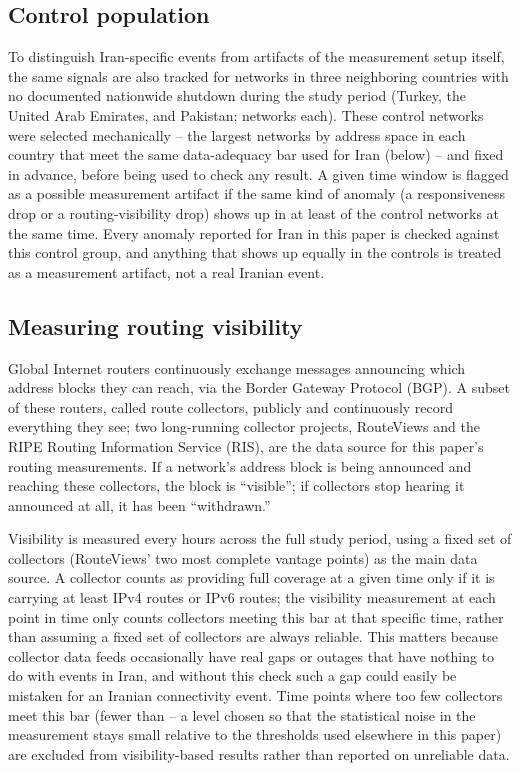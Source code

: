 \subsection{Control population}

To distinguish Iran-specific events from artifacts of the measurement
setup itself, the same signals are also tracked for \nControlAsnsTotal{}
networks in three neighboring countries with no documented nationwide
shutdown during the study period (Turkey, the United Arab Emirates, and
Pakistan; \nControlAsnsPerCountry{} networks each). These control networks
were selected mechanically -- the largest networks by address space in
each country that meet the same data-adequacy bar used for Iran (below) --
and fixed in advance, before being used to check any result. A given time
window is flagged as a possible measurement artifact if the same kind of
anomaly (a responsiveness drop or a routing-visibility drop) shows up in at
least \controlArtifactBinShare{} of the control networks at the same time.
Every anomaly reported for Iran in this paper is checked against this
control group, and anything that shows up equally in the controls is
treated as a measurement artifact, not a real Iranian event.

\subsection{Measuring routing visibility}
\label{sec:visibility}

Global Internet routers continuously exchange messages announcing which
address blocks they can reach, via the Border Gateway Protocol (BGP). A
subset of these routers, called route collectors, publicly and
continuously record everything they see; two long-running collector
projects, RouteViews and the RIPE Routing Information Service (RIS), are
the data source for this paper's routing measurements. If a network's
address block is being announced and reaching these collectors, the block
is ``visible''; if collectors stop hearing it announced at all, it has been
``withdrawn.''

Visibility is measured every \ribIntervalHours{} hours across the full
study period, using a fixed set of collectors (RouteViews' two most
complete vantage points) as the main data source. A collector counts as
providing full coverage at a given time only if it is carrying at least
\fullFeedMinIpvFour{} IPv4 routes or \fullFeedMinIpvSix{} IPv6 routes; the
visibility measurement at each point in time only counts collectors
meeting this bar at that specific time, rather than assuming a fixed set of
collectors are always reliable. This matters because collector data feeds
occasionally have real gaps or outages that have nothing to do with events
in Iran, and without this check such a gap could easily be mistaken for an
Iranian connectivity event. Time points where too few collectors meet this
bar (fewer than \minFullfeedPeers{} -- a level chosen so that the
statistical noise in the measurement stays small relative to the
thresholds used elsewhere in this paper) are excluded from
visibility-based results rather than reported on unreliable data.

